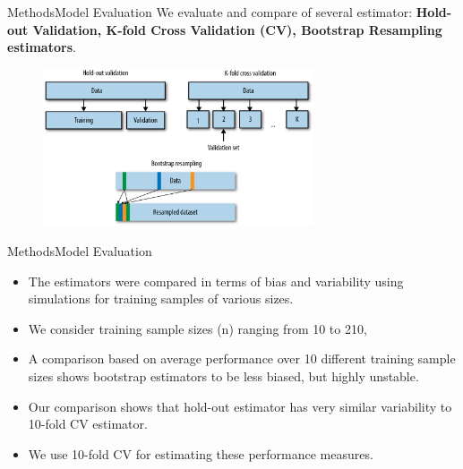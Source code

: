 \documentclass[xcolor=table]{beamer}
\numberwithin{figure}{section}
\numberwithin{equation}{section}
\begin{document}
\begin{frame}{Methods}{Model Evaluation}
We evaluate and compare of several estimator: \textbf{Hold-out Validation, K-fold Cross Validation (CV), Bootstrap Resampling estimators}.
\begin{figure}
\centering
\includegraphics[width=80mm]{pictures/CV.png}
\end{figure}
\end{frame}

\begin{frame}{Methods}{Model Evaluation}
\begin{itemize}
    \item  The estimators were compared in terms of bias and variability using simulations for training samples of various sizes. 
    \item We consider training sample sizes (n) ranging from 10 to 210, 
    \item A comparison based on average performance over 10 different training sample sizes shows bootstrap estimators to be less biased, but highly unstable.
    \item Our comparison shows that hold-out estimator has very similar variability to 10-fold CV estimator.
    \item We use 10-fold CV for estimating these performance measures.
\end{itemize}

\end{frame}
\end{document}
